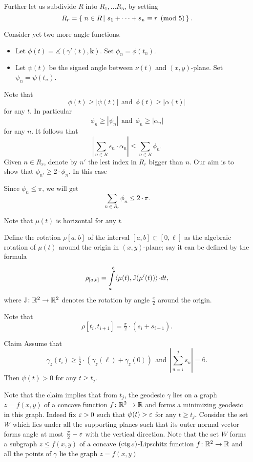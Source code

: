 \documentclass[a4paper,10pt]{amsart}
\begin{document}
Further let us subdivide $R$ into $R_1,\dots R_5$,
by setting 
\[R_r=\set{n\in R}{s_1+\dots+s_n\equiv r\pmod 5}.\]


Consider yet two more angle functions.
\begin{itemize}
\item Let $\phi(t)=\measuredangle(\gamma'(t),\bm{k})$. Set $\phi_n=\phi(t_n)$.
\item Let $\psi(t)$ be the signed angle between $\nu(t)$ and $(x,y)$-plane. 
Set $\psi_n=\psi(t_n)$.
\end{itemize}
Note that 
\[\phi(t)\ge |\psi(t)|\ \ \text{and}\ \  \phi(t)\ge |\alpha(t)|\] 
for any $t$.
In particular 
\[\phi_n\ge |\psi_n|\ \ \text{and}\ \  \phi_n\ge |\alpha_n|\]
for any $n$.
It follows that
\[|\sum_{n\in R}s_n\cdot \alpha_n|\le \sum_{n\in R}\phi_n.\]
Given $n\in R_r$, denote by $n'$ the lest index in $R_r$ bigger than $n$.
Our aim is to show that $\phi_{n'}\ge 2\cdot\phi_n$.
In this case 

Since $\phi_n\le \pi$, we will get
\[\sum_{n\in R_r}\phi_n\le 2\cdot \pi.\]

Note that $\mu(t)$ is horizontal for any $t$.

Define the rotation $\rho[a,b]$  
of the interval $[a,b]\subset[0,\ell]$
as the
algebraic rotation of $\mu(t)$ around the origin in $(x,y)$-plane;
say it can be defined by the formula 
\[\rho_{[a,b]}
=
\int\limits_a^b \<\mu(t),\mathrm{J}(\mu'(t))\>\cdot dt,\]
where $\mathrm{J}\colon\mathbb{R}^2\to\mathbb{R}^2$ denotes the rotation by angle $\tfrac\pi 2$ around the origin.

Note that 
\[\rho[t_i,t_{i+1}]=\tfrac\pi2\cdot(s_i+s_{i+1}).\]

\begin{thm}{Claim}
Assume that 
\[\gamma_z(t_i)\ge \tfrac12\cdot(\gamma_z(\ell)+\gamma_z(0))\ \ \text{and}\ \ \left|\sum_{n=i}^js_n\right|=6.\]
Then $\psi(t)>0$ for any $t\ge t_j$.
\end{thm}

Note that the claim implies that from $t_j$,
the geodesic $\gamma$ 
lies on a graph $z=f(x,y)$ of a concave function $f\colon\mathbb{R}^2\to\mathbb{R}$
and forms a minimizing geodesic in this graph.
Indeed fix $\varepsilon>0$ such that $\psi(t)>\varepsilon$
for any $t\ge t_j$.
Consider the set $W$ which lies under all the supporting planes 
such that its outer normal vector forms angle at most 
$\tfrac\pi2-\varepsilon$ with the vertical direction.
Note that the set $W$ forms a subgraph $z\le f(x,y)$ 
of a  concave $(\mathop{\rm ctg} \varepsilon)$-Lipschitz function $f\colon\mathbb{R}^2\to \mathbb{R}$
and all the points of $\gamma$ lie the graph $z=f(x,y)$
\end{document}
